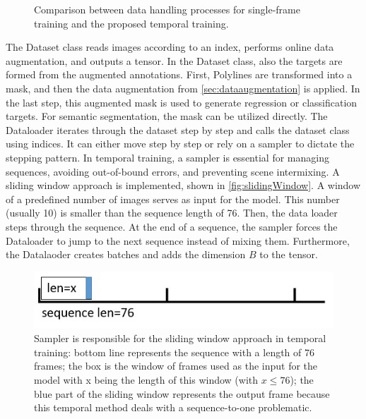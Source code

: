 \begin{figure}[H]
    \caption{Comparison between data handling processes for single-frame training and the proposed temporal training.}
    \label{fig:dataHandlingProcess}
\end{figure}

The Dataset class reads images according to an index, performs online data augmentation, and outputs a tensor.
In the Dataset class, also the targets are formed from the augmented annotations.
First, Polylines are transformed into a mask, and then the data augmentation from \autoref{sec:dataaugmentation} is applied.
In the last step, this augmented mask is used to generate regression or classification targets.
For semantic segmentation, the mask can be utilized directly.
The Dataloader iterates through the dataset step by step and calls the dataset class using indices.
It can either move step by step or rely on a sampler to dictate the stepping pattern.
In temporal training, a sampler is essential for managing sequences, avoiding out-of-bound errors, and preventing scene intermixing.
A sliding window approach is implemented, shown in \autoref{fig:slidingWindow}.
A window of a predefined number of images serves as input for the model.
This number (usually 10) is smaller than the sequence length of 76.
Then, the data loader steps through the sequence.
At the end of a sequence, the sampler forces the Dataloader to jump to the next sequence instead of mixing them.
Furthermore, the Datalaoder creates batches and adds the dimension $B$ to the tensor.

\begin{figure}[H]
    \centering
    \includegraphics[width=0.5\linewidth]{PICs/usedDatasets/slidingWindow.jpg}
    \caption{Sampler is responsible for the sliding window approach in temporal training: bottom line represents the sequence with a length of 76 frames; the box is the window of frames used as the input for the model with x being the length of this window (with $x \leq 76$); the blue part of the sliding window represents the output frame because this temporal method deals with a sequence-to-one problematic.}
    \label{fig:slidingWindow}
\end{figure}

